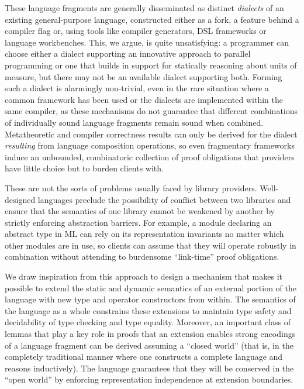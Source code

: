 \documentclass[9pt,preprint]{sigplanconf}
\begin{document}
These language fragments are generally disseminated as distinct \emph{dialects} of an existing general-purpose language, constructed either as a fork, a feature behind a compiler flag or, using tools like compiler generators, DSL frame\-works or  language workbenches. This, we argue, is quite unsatisfying: a programmer can choose either a dialect supporting an innovative approach to parallel programming or one that builds in support for statically reasoning about units of measure, but there may not be an available dialect supporting both. Forming such a dialect is alarmingly non-trivial, even in the rare situation where a common framework has been used or the dialects are implemented within the same compiler, as these mechanisms do not guarantee that different combinations of individually sound language fragments remain sound when combined. Metatheoretic and compiler correctness results can only be derived for the dialect \emph{resulting} from language   composition operations, so even  fragmentary frameworks induce an unbounded, combinatoric collection of proof obligations that providers have little choice but to  burden clients with.%

These are not the sorts of problems usually faced by library providers. Well-designed languages preclude the  possibility of conflict between two libraries and ensure that the semantics of one library  cannot be weakened by another by strictly enforcing abstraction barriers. For example, a module declaring an abstract type in ML can rely on its representation invariants no matter which other modules are in use, so clients can assume that they will operate robustly in combination without attending to burdensome ``link-time'' proof obligations. 

We draw inspiration from this approach to design a mechanism that makes it possible to extend the static and dynamic semantics of an external portion of the language with new type and operator constructors from within. The semantics of the language as a whole constrains these extensions to maintain type safety and decidability of type checking and type equality. Moreover, an important class of lemmas that play a key role in  proofs that an extension enables strong encodings of a language fragment can be derived assuming a ``closed world'' (that is, in the completely traditional manner where one constructs a complete language and reasons inductively). The language  guarantees that they will be conserved in the  ``open world'' by enforcing  representation independence at extension boundaries.
\end{document}
